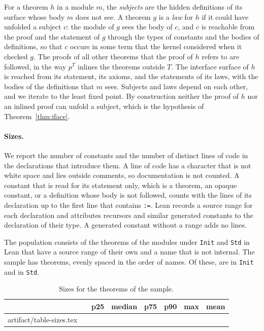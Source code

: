 \documentclass[acmsmall,nonacm,screen]{acmart}
\makeatletter
\newcommand{\lean}[1]{\texttt{#1}}
\newcommand{\rows}[1]{\@@input #1 }
\makeatother
\begin{document}
For a theorem $h$ in a module $m$, the \emph{subjects} are the hidden definitions of its surface
whose body $m$ does not see. A theorem $g$ is a \emph{law} for $h$ if it could have unfolded a
subject $c$: the module of $g$ sees the body of $c$, and $c$ is reachable from the proof and the
statement of $g$ through the types of constants and the bodies of definitions, so that $c$
occurs in some term that the kernel considered when it checked $g$. The proofs of all other
theorems that the proof of $h$ refers to are followed, in the way $p^T$ inlines the theorems
outside $T$. The interface surface of $h$ is reached from its statement, its axioms, and the
statements of its laws, with the bodies of the definitions that $m$ sees. Subjects and laws
depend on each other, and we iterate to the least fixed point. By construction neither the
proof of $h$ nor an inlined proof can unfold a subject, which is the hypothesis of
Theorem~\ref{thm:iface}.

\paragraph{Sizes.}
We report the number of constants and the number of distinct lines of code in the declarations
that introduce them. A line of code has a character that is not white space and lies outside
comments, so documentation is not counted. A constant that is read for its statement only, which
is a theorem, an opaque constant, or a definition whose body is not followed, counts with the
lines of its declaration up to the first line that contains \lean{:=}. Lean records a source
range for each declaration and attributes recursors and similar generated constants to the
declaration of their type. A generated constant without a range adds no lines.

The population consists of the \NumPopulation{} theorems of the modules under \lean{Init} and
\lean{Std} in Lean \LeanVersion{} that have a source range of their own and a name that is not
internal. The sample has \NumSample{} theorems, evenly spaced in the order of names. Of these,
\NumInit{} are in \lean{Init} and \NumStd{} in \lean{Std}.

\begin{table}
\caption{Sizes for the theorems of the sample.}
\label{tab:sizes}
\begin{tabular}{llrrrrrr}
\toprule
 & & p25 & median & p75 & p90 & max & mean \\
\midrule
\rows{artifact/table-sizes.tex}
\bottomrule
\end{tabular}
\end{table}
\end{document}
